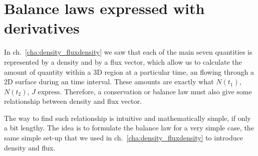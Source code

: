 \documentclass[a4paper,12pt,%
onecolumn,oneside,titlepage,%
british%
]{memoir}
\renewcommand*{\|}[1][]{\nonscript\:#1\vert\nonscript\:\mathopen{}}
\newcommand*{\chap}{ch.}%
\newcommand*{\yN}{N}
\newcommand*{\yJ}{J}
\begin{document}



\section{Balance laws expressed with derivatives}
\label{sec:balance_derivative}

In \chap~\ref{cha:density_fluxdensity} we saw that each of the main seven quantities is represented by a density and by a flux vector, which allow us to calculate the amount of quantity within a 3D region at a particular time, an flowing through a 2D surface during an time interval. These amounts are exactly what $\yN(t_{1})$, $\yN(t_{2})$, $\yJ$ express. Therefore, a conservation or balance law must also give some relationship between density and flux vector.

The way to find such relationship is intuitive and mathematically simple, if only a bit lengthy. The idea is to formulate the balance law for a very simple case, the same simple set-up that we used in \chap~\ref{cha:density_fluxdensity} to introduce density and flux.
\end{document}
